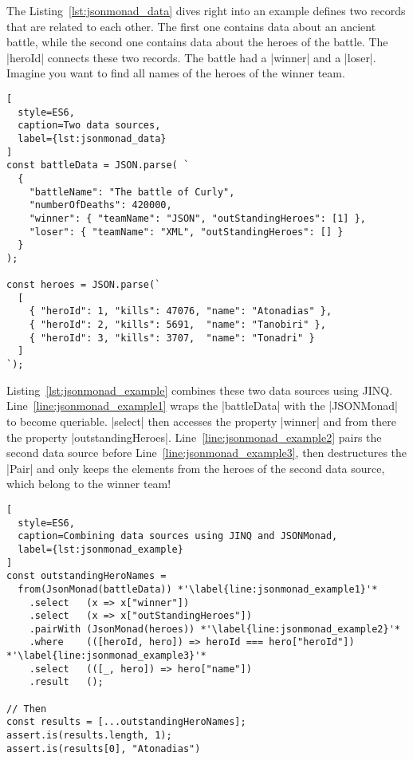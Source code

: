 The Listing~\ref{lst:jsonmonad_data} dives right into an example defines two
records that are related to each other. The first one contains data about an
ancient battle, while the second one contains data about the heroes of the
battle. The |heroId| connects these two records. The battle had a |winner| and
a |loser|. Imagine you want to find all names of the heroes of the winner team.

\begin{lstlisting}[
  style=ES6,
  caption=Two data sources,
  label={lst:jsonmonad_data}
]
const battleData = JSON.parse( `
  {
    "battleName": "The battle of Curly",
    "numberOfDeaths": 420000,
    "winner": { "teamName": "JSON", "outStandingHeroes": [1] },
    "loser": { "teamName": "XML", "outStandingHeroes": [] }
  }
);

const heroes = JSON.parse(`
  [
    { "heroId": 1, "kills": 47076, "name": "Atonadias" },
    { "heroId": 2, "kills": 5691,  "name": "Tanobiri" },
    { "heroId": 3, "kills": 3707,  "name": "Tonadri" }
  ]
`);
\end{lstlisting}

Listing~\ref{lst:jsonmonad_example} combines these two data sources using JINQ.
Line~\ref{line:jsonmonad_example1} wraps the |battleData| with the |JSONMonad|
to become queriable. |select| then accesses the property |winner| and from
there the property |outstandingHeroes|. Line~\ref{line:jsonmonad_example2}
pairs the second data source before Line~\ref{line:jsonmonad_example3}, then
destructures the |Pair| and only keeps the elements from the heroes of the
second data source, which belong to the winner team!

\begin{lstlisting}[
  style=ES6,
  caption=Combining data sources using JINQ and JSONMonad,
  label={lst:jsonmonad_example}
]
const outstandingHeroNames =
  from(JsonMonad(battleData)) *'\label{line:jsonmonad_example1}'*
    .select   (x => x["winner"])
    .select   (x => x["outStandingHeroes"])
    .pairWith (JsonMonad(heroes)) *'\label{line:jsonmonad_example2}'*
    .where    (([heroId, hero]) => heroId === hero["heroId"]) *'\label{line:jsonmonad_example3}'*
    .select   (([_, hero]) => hero["name"])
    .result   ();

// Then
const results = [...outstandingHeroNames];
assert.is(results.length, 1);
assert.is(results[0], "Atonadias")
\end{lstlisting}

